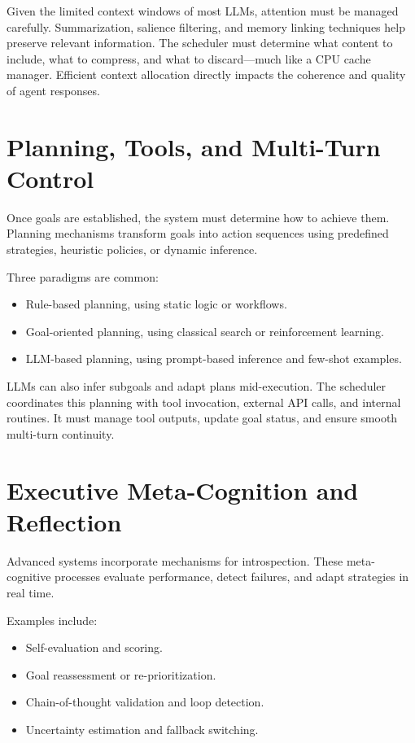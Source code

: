 \documentclass{book}
\begin{document}
Given the limited context windows of most LLMs, attention must be managed carefully. Summarization, salience filtering, and memory linking techniques help preserve relevant information. The scheduler must determine what content to include, what to compress, and what to discard—much like a CPU cache manager. Efficient context allocation directly impacts the coherence and quality of agent responses.

\section{Planning, Tools, and Multi-Turn Control}

Once goals are established, the system must determine how to achieve them. Planning mechanisms transform goals into action sequences using predefined strategies, heuristic policies, or dynamic inference.

Three paradigms are common:
\begin{itemize}
  \item Rule-based planning, using static logic or workflows.
  \item Goal-oriented planning, using classical search or reinforcement learning.
  \item LLM-based planning, using prompt-based inference and few-shot examples.
\end{itemize}

LLMs can also infer subgoals and adapt plans mid-execution. The scheduler coordinates this planning with tool invocation, external API calls, and internal routines. It must manage tool outputs, update goal status, and ensure smooth multi-turn continuity.

\section{Executive Meta-Cognition and Reflection}

Advanced systems incorporate mechanisms for introspection. These meta-cognitive processes evaluate performance, detect failures, and adapt strategies in real time.

Examples include:
\begin{itemize}
  \item Self-evaluation and scoring.
  \item Goal reassessment or re-prioritization.
  \item Chain-of-thought validation and loop detection.
  \item Uncertainty estimation and fallback switching.
\end{itemize}
\end{document}
